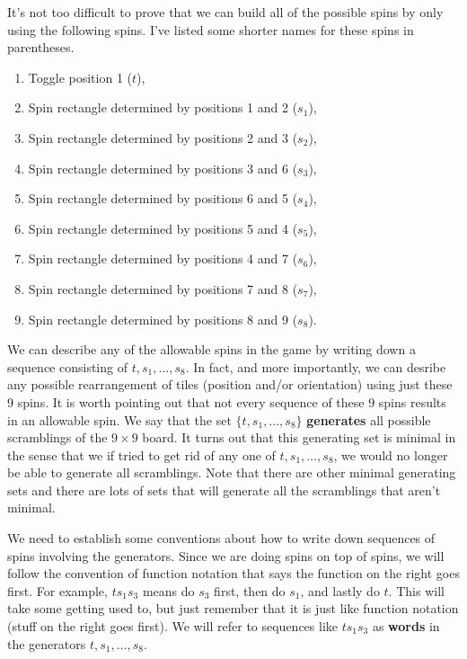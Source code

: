 It's not too difficult to prove that we can build all of the possible spins by only using the following spins.  I've listed some shorter names for these spins in parentheses.
\begin{enumerate}
\item Toggle position 1 ($t$),
\item Spin rectangle determined by positions 1 and 2 ($s_1$),
\item Spin rectangle determined by positions 2 and 3 ($s_2$),
\item Spin rectangle determined by positions 3 and 6 ($s_3$),
\item Spin rectangle determined by positions 6 and 5 ($s_4$),
\item Spin rectangle determined by positions 5 and 4 ($s_5$),
\item Spin rectangle determined by positions 4 and 7 ($s_6$),
\item Spin rectangle determined by positions 7 and 8 ($s_7$),
\item Spin rectangle determined by positions 8 and 9 ($s_8$).
\end{enumerate}
We can describe any of the allowable spins in the game by writing down a sequence consisting of $t,s_1,\ldots, s_8$.  In fact, and more importantly, we can desribe any possible rearrangement of tiles (position and/or orientation) using just these 9 spins.  It is worth pointing out that not every sequence of these 9 spins results in an allowable spin.  We say that the set $\{t, s_1,\ldots,s_8\}$ \textbf{generates} all possible scramblings of the $9\times 9$ board.  It turns out that this generating set is minimal in the sense that we if tried to get rid of any one of $t, s_1, \ldots, s_8$, we would no longer be able to generate all scramblings.  Note that there are other minimal generating sets and there are lots of sets that will generate all the scramblings that aren't minimal.

We need to establish some conventions about how to write down sequences of spins involving the generators.  Since we are doing spins on top of spins, we will follow the convention of function notation that says the function on the right goes first.  For example, $ts_1 s_3$ means do $s_3$ first, then do $s_1$, and lastly do $t$.  This will take some getting used to, but just remember that it is just like function notation (stuff on the right goes first).  We will refer to sequences like $ts_1 s_3$ as \textbf{words} in the generators $t,s_1,\ldots, s_8$.

